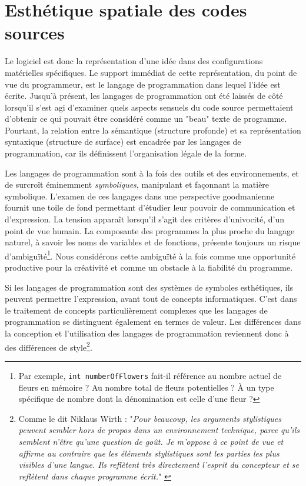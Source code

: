 \documentclass{article}
\begin{document}
\section*{Esthétique spatiale des codes sources}

Le logiciel est donc la représentation d'une idée dans des configurations matérielles spécifiques. Le support immédiat de cette représentation, du point de vue du programmeur, est le langage de programmation dans lequel l'idée est écrite. Jusqu'à présent, les langages de programmation ont été laissés de côté lorsqu'il s'est agi d'examiner quels aspects sensuels du code source permettaient d'obtenir ce qui pouvait être considéré comme un "beau" texte de programme. Pourtant, la relation entre la sémantique (structure profonde) et sa représentation syntaxique (structure de surface) est encadrée par les langages de programmation, car ils définissent l'organisation légale de la forme.

Les langages de programmation sont à la fois des outils et des environnements, et de surcroît éminemment \emph{symboliques}, manipulant et façonnant la matière symbolique. L'examen de ces langages dans une perspective goodmanienne fournit une toile de fond permettant d'étudier leur pouvoir de communication et d'expression. La tension apparaît lorsqu'il s'agit des critères d'univocité, d'un point de vue humain. La composante des programmes la plus proche du langage naturel, à savoir les noms de variables et de fonctions, présente toujours un risque d'ambiguïté\footnote{Par exemple, \lstinline{int numberOfFlowers} fait-il référence au nombre actuel de fleurs en mémoire ? Au nombre total de fleurs potentielles ? À un type spécifique de nombre dont la dénomination est celle d'une fleur ?}. Nous considérons cette ambiguïté à la fois comme une opportunité productive pour la créativité et comme un obstacle à la fiabilité du programme.

Si les langages de programmation sont des systèmes de symboles esthétiques, ils peuvent permettre l'expression, avant tout de concepts informatiques. C'est dans le traitement de concepts particulièrement complexes que les langages de programmation se distinguent également en termes de valeur. Les différences dans la conception et l'utilisation des langages de programmation reviennent donc à des différences de style\footnote{Comme le dit Niklaus Wirth : "\emph{Pour beaucoup, les arguments stylistiques peuvent sembler hors de propos dans un environnement technique, parce qu'ils semblent n'être qu'une question de goût. Je m'oppose à ce point de vue et affirme au contraire que les éléments stylistiques sont les parties les plus visibles d'une langue. Ils reflètent très directement l'esprit du concepteur et se reflètent dans chaque programme écrit.}" \citep{wirth_essence_2003}}.
\end{document}
